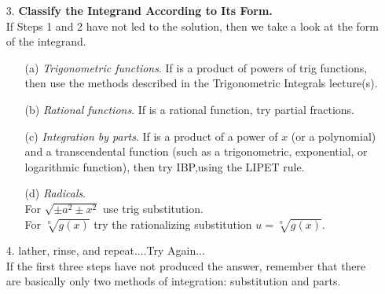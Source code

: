  \begin{frame}
 \begin{enumerate}
\item[3.] \textbf{Classify the Integrand According to Its Form.}\\
 If Steps 1 and 2 have not led to the
solution, then we take a look at the form of the integrand.\\
\begin{enumerate} \pause 
\item[(a)]  \textit{Trigonometric functions}. If is a product of powers of trig functions, then use the methods described in the Trigonometric Integrals lecture(s). \pause 
\item[(b)] \textit{Rational functions}. If is a rational function, try partial fractions.
\pause 
\item[(c)] \textit{Integration by parts}. If is a product of a power of $ x $ (or a polynomial) and a transcendental function (such as a trigonometric, exponential, or logarithmic function), then try IBP,using the LIPET rule.  
\pause 
\item[(d)] \textit{Radicals}. \\
For $ \sqrt{\pm a^2 \pm x^2} $ use trig substitution.\\
For $ \sqrt[n]{g(x)} $ try the rationalizing substitution $ u= \sqrt[n]{g(x)}. $
\pause 
\end{enumerate} 
 \item[4.] lather, rinse, and repeat....Try Again...\\
 
 If the first three steps have not produced the answer, remember that
 there are basically only two methods of integration: substitution and parts.
\end{enumerate}

\end{frame}



